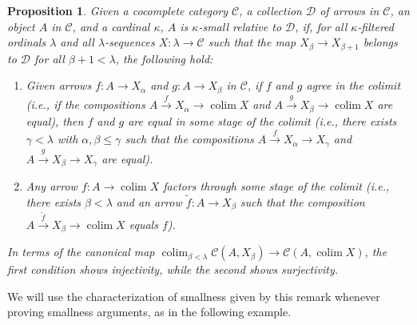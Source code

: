 \documentclass{amsart}
\theoremstyle{plain}
\newtheorem{proposition}[theorem]{Proposition}
\theoremstyle{definition}
\newcommand{\wt}{\widetilde}
\newcommand{\0}{\mathbf{0}}
\newcommand{\cC}{\mathcal C}
\newcommand{\cD}{\mathcal D}
\renewcommand{\(}{\left(}
\renewcommand{\)}{\right)}
\DeclareMathOperator*{\colim}{colim}
\begin{document}
\begin{proposition}\label{nicer_description_of_smallness_conditions}
  Given a cocomplete category $\cC$, a collection $\cD$ of arrows in $\cC$, an object $A$ in $\cC$, and a cardinal $\kappa$, $A$ is $\kappa$-small relative to $\cD$, if, for all $\kappa$-filtered ordinals $\lambda$ and all $\lambda$-sequences $X:\lambda\to\cC$ such that the map $X_{\beta}\to X_{\beta+1}$ belongs to $\cD$ for all $\beta+1<\lambda$, the following hold:
  \begin{enumerate}[label=(\roman*)]
    \item Given arrows $f:A\to X_\alpha$ and $g:A\to X_{\beta}$ in $\cC$, if $f$ and $g$ agree in the colimit (i.e., if the compositions $A\xrightarrow{f} X_\alpha\to\colim X$ and $A\xrightarrow{g} X_{\beta}\to \colim X$ are equal), then $f$ and $g$ are equal in some stage of the colimit (i.e., there exists $\gamma<\lambda$ with $\alpha,\beta\leq\gamma$ such that the compositions $A\xrightarrow{f} X_\alpha\to X_\gamma$ and $A\xrightarrow{g} X_{\beta}\to X_{\gamma}$ are equal).
    \item Any arrow $f:A\to\colim X$ factors through some stage of the colimit (i.e., there exists $\beta<\lambda$ and an arrow $\wt f:A\to X_\beta$ such that the composition $A\xrightarrow{\wt f}X_\beta\to\colim X$ equals $f$).
  \end{enumerate}
  In terms of the canonical map $\colim_{\beta<\lambda}\cC(A,X_\beta)\to\cC(A,\colim X)$, the first condition shows injectivity, while the second shows surjectivity.
\end{proposition}

We will use the characterization of smallness given by this remark whenever proving smallness arguments, as in the following example.
\end{document}
